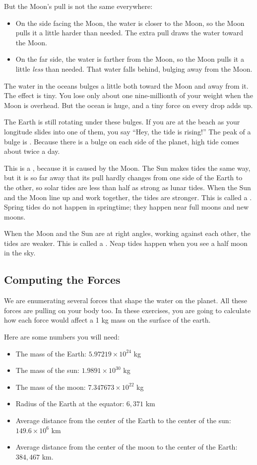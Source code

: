 But the Moon's pull is not the same everywhere:
\begin{itemize}
\item On the side facing the Moon, the water is closer to the Moon, so the
      Moon pulls it a little harder than needed. The extra pull draws the
      water toward the Moon.
\item On the far side, the water is farther from the Moon, so the Moon
      pulls it a little \emph{less} than needed. That water falls behind,
      bulging away from the Moon.
\end{itemize}

The water in the oceans bulges a little both toward the Moon and away from
it. The effect is tiny. You lose only about one nine-millionth of your
weight when the Moon is overhead. But the ocean is huge, and a tiny force
on every drop adds up.

The Earth is still rotating under these bulges. If you are at the beach as
your longitude slides into one of them, you say ``Hey, the tide is
rising!'' The peak of a bulge is . Because there is a
bulge on each side of the planet, high tide comes about twice a day.

This is a , because it is caused by
the Moon. The Sun makes tides the same way, but it is so far away that its
pull hardly changes from one side of the Earth to the other, so solar tides
are less than half as strong as lunar tides. When the Sun and the Moon line
up and work together, the tides are stronger. This is called a
. Spring tides do not happen in
springtime; they happen near full moons and new moons.

When the Moon and the Sun are at right angles, working against each
other, the tides are weaker. This is called a . Neap tides happen when you see a half moon in the sky.

\subsection{Computing the Forces}

We are enumerating several forces that shape the water on the planet.  All these forces are pulling on your
body too.  In these exercises, you are going to calculate how each force would affect a 1 kg mass on the surface of the earth.

Here are some numbers you will need:
\begin{itemize}
\item The mass of the Earth: $5.97219 \times 10^{24}$ kg
\item The mass of the sun:  $1.9891 \times 10^{30}$ kg
\item The mass of the moon: $7.347673 \times 10^{22}$ kg
\item Radius of the Earth at the equator: $6,371$ km
\item Average distance from the center of the Earth to the center of the sun:  $149.6 \times 10^6$ km
\item Average distance from the center of the moon to the center of the Earth: $384,467$ km.
\end{itemize}



